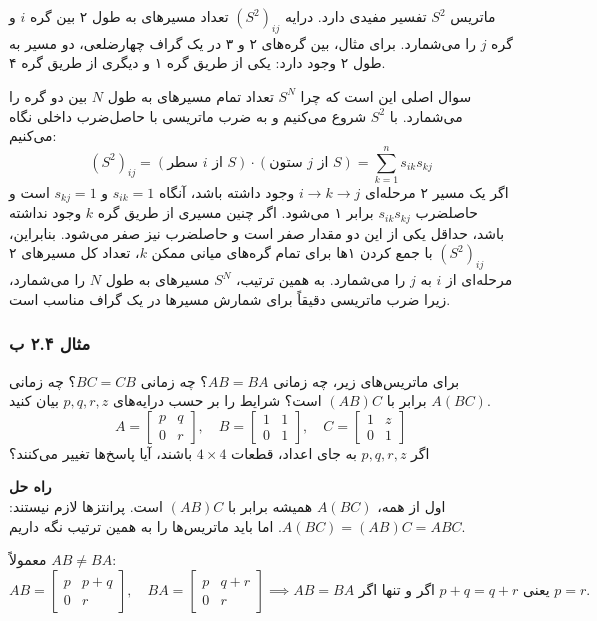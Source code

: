 \documentclass[12pt, a4paper]{book}
\begin{document}
	ماتریس $S^2$ تفسیر مفیدی دارد. درایه $(S^2)_{ij}$ تعداد مسیرهای به طول ۲ بین گره $i$ و گره $j$ را می‌شمارد. برای مثال، بین گره‌های ۲ و ۳ در یک گراف چهارضلعی، دو مسیر به طول ۲ وجود دارد: یکی از طریق گره ۱ و دیگری از طریق گره ۴.
	
	سوال اصلی این است که چرا $S^N$ تعداد تمام مسیرهای به طول $N$ بین دو گره را می‌شمارد. با $S^2$ شروع می‌کنیم و به ضرب ماتریسی با حاصل‌ضرب داخلی نگاه می‌کنیم:
	\[ (S^2)_{ij} = (\text{سطر } i \text{ از } S) \cdot (\text{ستون } j \text{ از } S) = \sum_{k=1}^{n} s_{ik}s_{kj} \]
	اگر یک مسیر ۲ مرحله‌ای $i \to k \to j$ وجود داشته باشد، آنگاه $s_{ik}=1$ و $s_{kj}=1$ است و حاصلضرب $s_{ik}s_{kj}$ برابر ۱ می‌شود. اگر چنین مسیری از طریق گره $k$ وجود نداشته باشد، حداقل یکی از این دو مقدار صفر است و حاصلضرب نیز صفر می‌شود. بنابراین، $(S^2)_{ij}$ با جمع کردن ۱‌ها برای تمام گره‌های میانی ممکن $k$، تعداد کل مسیرهای ۲ مرحله‌ای از $i$ به $j$ را می‌شمارد. به همین ترتیب، $S^N$ مسیرهای به طول $N$ را می‌شمارد، زیرا ضرب ماتریسی دقیقاً برای شمارش مسیرها در یک گراف مناسب است.
	
	\subsubsection*{مثال ۲.۴ ب}
	برای ماتریس‌های زیر، چه زمانی $AB=BA$؟ چه زمانی $BC=CB$؟ چه زمانی $A(BC)$ برابر با $(AB)C$ است؟ شرایط را بر حسب درایه‌های $p, q, r, z$ بیان کنید.
	\[ A = \begin{bmatrix} p & q \\ 0 & r \end{bmatrix}, \quad B = \begin{bmatrix} 1 & 1 \\ 0 & 1 \end{bmatrix}, \quad C = \begin{bmatrix} 1 & z \\ 0 & 1 \end{bmatrix} \]
	اگر $p,q,r,z$ به جای اعداد، قطعات $4 \times 4$ باشند، آیا پاسخ‌ها تغییر می‌کنند؟
	
	\textbf{راه حل} \\
	اول از همه، $A(BC)$ همیشه برابر با $(AB)C$ است. پرانتزها لازم نیستند: $A(BC)=(AB)C=ABC$. اما باید ماتریس‌ها را به همین ترتیب نگه داریم.
	
	معمولاً $AB \neq BA$:
	\[ AB = \begin{bmatrix} p & p+q \\ 0 & r \end{bmatrix}, \quad BA = \begin{bmatrix} p & q+r \\ 0 & r \end{bmatrix} \implies AB=BA \text{ اگر و تنها اگر } p+q=q+r \text{ یعنی } p=r. \]
	
\end{document}
